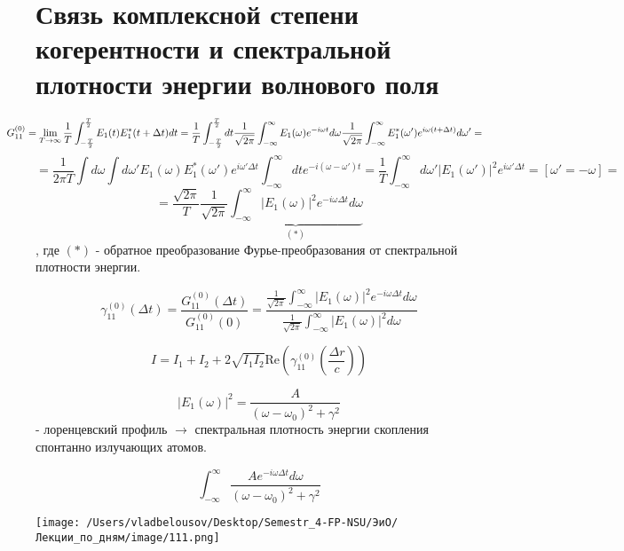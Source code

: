 \documentclass[12pt, a4paper]{report}
\begin{document}
\fi


\section{Связь комплексной степени когерентности и спектральной плотности энергии волнового поля} 

\[\kern-1cm G_{11}^{(0)} = \lim_{T  \to \infty} \frac{1}{T }  \int_{-\frac{T}{2 } }^{\frac{T}{2 }  } E_1(t ) E_1 ^{* }  (t +\Delta t ) dt = \frac{1}{T }  \int_{-\frac{T}{2 } }^{\frac{T}{2 } } dt \frac{1}{\sqrt{2 \pi } } \int_{-\infty}^{\infty} E_1 (\omega ) e^{ - i \omega t } d \omega    \frac{1}{\sqrt{2 \pi } } \int_{-\infty}^{\infty} E_1 ^{* }  (\omega ' ) e^{i \omega (t + \Delta t )} d \omega ' =        \] 
\[ = \frac{1}{2 \pi T } \int  d \omega \int d \omega ' E_1 ( \omega ) E_1 ^{* }  (\omega ' ) e^{i \omega ' \Delta t } \int_{-\infty}^{\infty} dt e^{- i (\omega - \omega'  )t} = \frac{1}{T }  \int_{-\infty}^{\infty} d \omega' |E_1 (\omega' )| ^2 e^{ i \omega ' \Delta t } = \left[ \omega' = -\omega \right]    = \] 
\[  =\frac{\sqrt{2 \pi } } {T } \frac{1}{\sqrt{2 \pi } } \underbrace{\int_{-\infty}^{\infty} |E_1(\omega )| ^2 e^{ - i \omega \Delta t } d \omega}_{(*)}   \] 
, где \( (*) \)  - обратное преобразование Фурье-преобразования от спектральной плотности энергии.

\[ \gamma_{11}^{(0 )}   (\Delta t ) = \frac{ G_{11} ^{(0 )} (\Delta t )}{G_{11}^{(0 )}  (0 )}= \frac{\displaystyle  \frac{1}{\sqrt{ 2 \pi } } \int_{-\infty}^{\infty} |E_1 (\omega )| ^2 e^{ - i \omega \Delta t }d \omega  }{\displaystyle  \frac{1}{ \sqrt{2 \pi }} \int_{-\infty}^{\infty} |E_1 (\omega )| ^2 d \omega }   \] 

\[ I = I_1 + I_2 + 2 \sqrt{I_1 I_2 } \mathrm{Re }  \left( \gamma_{11} ^{ (0 )} \left( \frac{\Delta r }{c}  \right) \right)   \] 

\[ |E_1 (\omega)| ^2 = \frac{A}{(\omega - \omega_0 ) ^2 + \gamma ^2 }   \]
- лоренцевский профиль \( \to  \) спектральная плотность энергии скопления спонтанно излучающих атомов. 

\[ \int_{-\infty}^{\infty} \frac{A e^{ - i \omega \Delta t }d \omega         }{(\omega - \omega_0 ) ^2 + \gamma ^2 }  \] 

\begin{center}
    \texttt{[image: /Users/vladbelousov/Desktop/Semestr\_4-FP-NSU/ЭиО/Лекции\_по\_дням/image/111.png]}
\end{center}
\end{document}
